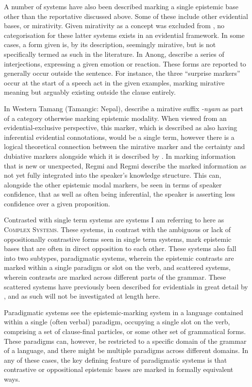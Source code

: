 A number of systems have also been described marking a single epistemic base other than the reportative discussed above. Some of these include other evidential bases, or mirativity. Given mirativity as a concept was excluded from , no categorisation for these latter systems exists in an evidential framework. In some cases, a form given is, by its description, seemingly mirative, but is not specifically termed as such in the literature. In Anong,  describe a series of interjections, expressing a given emotion or reaction. These forms are reported to generally occur outside the sentence. For instance, the three ``surprise markers'' \cite[111]{Sun2009} occur at the start of a speech act in the given examples, marking mirative meaning but arguably existing outside the clause entirely. 

In Western Tamang (Tamangic: Nepal),  describe a mirative suffix \textit{-nyam} as part of a category otherwise marking epistemic modality. When viewed from an evidential-exclusive perspective, this marker, which is described as also having inferential evidential connotations, would be a single term, however there is a logical theoretical connection between the mirative marker and the certainty and dubiative markers alongside which it is described by . In marking information that is new or unexpected, Regmi and Regmi describe the marked information as not yet fully integrated into the speaker's knowledge structure. This can, alongside the other epistemic modal markers, be seen in terms of speaker confidence, that as well as often being inferential, the speaker is asserting less confidence over a given proposition.

Contrasted with single term systems are systems I am referring to here as \textsc{Complex Systems}. These systems, in contrast with the ambiguous or lack of oppositionally contrastive forms seen in single term systems, mark epistemic bases that are often in direct opposition to each other. These systems also fall into two subtypes, paradigmatic systems, wherein the epistemic contrasts are marked within a single paradigm or slot on the verb, and scattered systems, wherein contrasts are marked across different parts of the grammar. These scattered systems have previously been described for evidentials in great detail by , and as such will not be investigated at length here.

Paradigmatic systems see the epistemic-marking system in a language contained within a single (often verbal) paradigm, occupying a single slot on the verb, comprising a set of clause-final particles, or some other set of grammatical forms. These paradigms can, however, be restricted to a specific domain of the grammar of a language, and there might be multiple paradigms across different domains. In any of these cases, the key defining feature of paradigmatic systems is that contrastive or oppositional epistemic bases are marked in formally equivalent ways.

